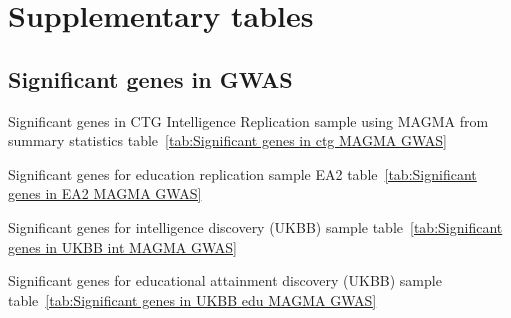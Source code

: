 \chapter{Supplementary tables}




\section{Significant genes in GWAS}
Significant genes in CTG Intelligence Replication sample using MAGMA from summary statistics table~\ref{tab:Significant genes in ctg MAGMA GWAS}

Significant genes for education replication sample EA2 table~\ref{tab:Significant genes in EA2 MAGMA GWAS}




Significant genes for intelligence discovery (UKBB) sample table~\ref{tab:Significant genes in UKBB int MAGMA GWAS}

Significant genes for educational attainment discovery (UKBB) sample table~\ref{tab:Significant genes in UKBB edu MAGMA GWAS}


